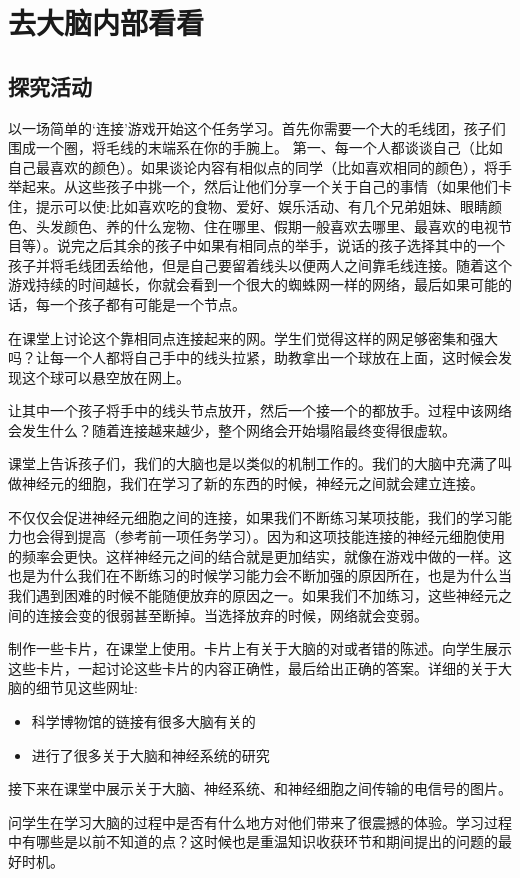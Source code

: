 \chapter{去大脑内部看看}
    
\section{探究活动}
    以一场简单的‘连接’游戏开始这个任务学习。首先你需要一个大的毛线团，孩子们围成一个圈，将毛线的末端系在你的手腕上。\pat
    第一、每一个人都谈谈自己（比如自己最喜欢的颜色）。如果谈论内容有相似点的同学（比如喜欢相同的颜色），将手举起来。从这些孩子中挑一个，然后让他们分享一个关于自己的事情（如果他们卡住，提示可以使:比如喜欢吃的食物、爱好、娱乐活动、有几个兄弟姐妹、眼睛颜色、头发颜色、养的什么宠物、住在哪里、假期一般喜欢去哪里、最喜欢的电视节目等）。说完之后其余的孩子中如果有相同点的举手，说话的孩子选择其中的一个孩子并将毛线团丢给他，但是自己要留着线头以便两人之间靠毛线连接。随着这个游戏持续的时间越长，你就会看到一个很大的蜘蛛网一样的网络，最后如果可能的话，每一个孩子都有可能是一个节点。\par
    在课堂上讨论这个靠相同点连接起来的网。学生们觉得这样的网足够密集和强大吗？让每一个人都将自己手中的线头拉紧，助教拿出一个球放在上面，这时候会发现这个球可以悬空放在网上。\par
    让其中一个孩子将手中的线头节点放开，然后一个接一个的都放手。过程中该网络会发生什么？随着连接越来越少，整个网络会开始塌陷最终变得很虚软。\par
    课堂上告诉孩子们，我们的大脑也是以类似的机制工作的。我们的大脑中充满了叫做神经元的细胞，我们在学习了新的东西的时候，神经元之间就会建立连接。\par
    不仅仅会促进神经元细胞之间的连接，如果我们不断练习某项技能，我们的学习能力也会得到提高（参考前一项任务学习）。因为和这项技能连接的神经元细胞使用的频率会更快。这样神经元之间的结合就是更加结实，就像在游戏中做的一样。这也是为什么我们在不断练习的时候学习能力会不断加强的原因所在，也是为什么当我们遇到困难的时候不能随便放弃的原因之一。如果我们不加练习，这些神经元之间的连接会变的很弱甚至断掉。当选择放弃的时候，网络就会变弱。\par
    制作一些卡片，在课堂上使用。卡片上有关于大脑的对或者错的陈述。向学生展示这些卡片，一起讨论这些卡片的内容正确性，最后给出正确的答案。详细的关于大脑的细节见这些网址:\par
    \begin{itemize}
      \item 科学博物馆的链接有很多大脑有关的
      \item {}进行了很多关于大脑和神经系统的研究
    \end{itemize}  
    接下来在课堂中展示关于大脑、神经系统、和神经细胞之间传输的电信号的图片。\par
    问学生在学习大脑的过程中是否有什么地方对他们带来了很震撼的体验。学习过程中有哪些是以前不知道的点？这时候也是重温知识收获环节和期间提出的问题的最好时机。

